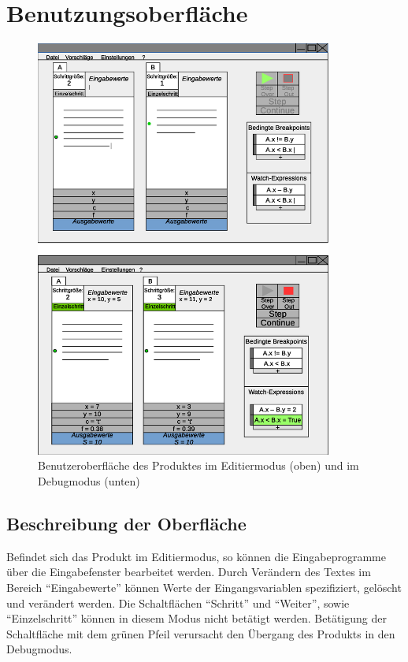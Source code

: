 \documentclass[parskip=full]{scrartcl}
\begin{document}
\section{Benutzungsoberfläche}
\begin{figure}[!ht] 
    \vspace{-10pt}
    \centering
       \includegraphics[width=0.87\textwidth]{skizzeFull.eps}
       \caption{
         Benutzeroberfläche des Produktes im Editiermodus (oben) und im Debugmodus
         (unten)
       }
    \label{fig:Bild4}
\end{figure}

\newpage
    \subsection{Beschreibung der Oberfläche}
        Befindet sich das Produkt im \gls{Editiermodus}, so können die Eingabeprogramme über die 
        Eingabefenster bearbeitet werden.
        Durch Verändern des Textes im Bereich \enquote{Eingabewerte} können Werte der Eingangsvariablen
        spezifiziert, gelöscht und verändert werden. 
        Die Schaltflächen \enquote{\gls{Schritt}} und \enquote{Weiter}, sowie \enquote{\gls{Einzelschritt}} können in diesem Modus nicht betätigt
        werden. Betätigung der Schaltfläche mit dem grünen Pfeil verursacht den Übergang des Produkts in den Debugmodus.
        
\end{document}
